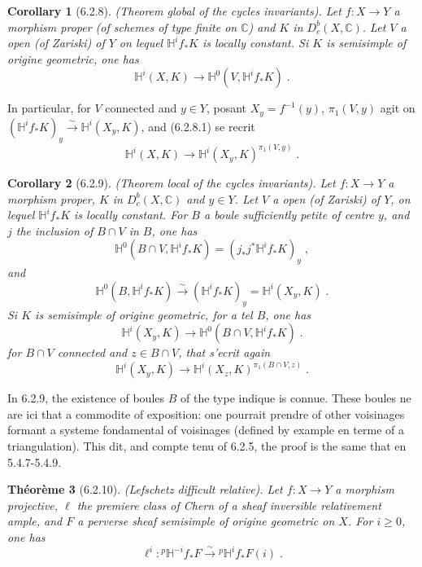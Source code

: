 \documentclass[12pt,a4paper]{article}
\theoremstyle{plain}
\newtheorem{theorem}{Th\'eor\`eme}[section]
\newtheorem{corollary}[theorem]{Corollary}
\theoremstyle{definition}
\theoremstyle{remark}
\newcommand{\CC}{\mathbb{C}}
\newcommand{\HH}{\mathbb{H}}
\begin{document}
\begin{corollary}[6.2.8]\label{cor:6.2.8}(Theorem global of the cycles invariants).
Let $f: X \to Y$ a morphism proper (of schemes of type finite on $\CC$) and $K$ in $D^b_c(X, \CC)$. Let $V$ a open (of Zariski) of $Y$ on lequel $\HH^if_*K$ is locally constant. Si $K$ is semisimple of origine geometric, one has
\begin{equation}\label{eq:6.2.8.1}
\HH^i(X, K) \longrightarrow \HH^0(V, \HH^if_*K)\;.
\end{equation}
\end{corollary}

In particular, for $V$ connected and $y \in Y$, posant $X_y = f^{-1}(y)$, $\pi_1(V, y)$ agit on $(\HH^if_*K)_y \xrightarrow{\sim} \HH^i(X_y, K)$, and (6.2.8.1) se recrit
\begin{equation}\label{eq:6.2.8.2}
\HH^i(X, K) \longrightarrow \HH^i(X_y, K)^{\pi_1(V, y)}\;.
\end{equation}

\begin{corollary}[6.2.9]\label{cor:6.2.9}(Theorem local of the cycles invariants).
Let $f: X \to Y$ a morphism proper, $K$ in $D^b_c(X, \CC)$ and $y \in Y$. Let $V$ a open (of Zariski) of $Y$, on lequel $\HH^if_*K$ is locally constant. For $B$ a boule sufficiently petite of centre $y$, and $j$ the inclusion of $B \cap V$ in $B$, one has
\[
\HH^0(B \cap V, \HH^if_*K) = (j_*j^*\HH^if_*K)_y\;,
\]
and
\[
\HH^0(B, \HH^if_*K) \xrightarrow{\sim} (\HH^if_*K)_y = \HH^i(X_y, K)\;.
\]
Si $K$ is semisimple of origine geometric, for a tel $B$, one has
\begin{equation}\label{eq:6.2.9.1}
\HH^i(X_y, K) \longrightarrow \HH^0(B \cap V, \HH^if_*K)\;.
\end{equation}
for $B \cap V$ connected and $z \in B \cap V$, that s'ecrit again
\begin{equation}\label{eq:6.2.9.2}
\HH^i(X_y, K) \longrightarrow \HH^i(X_z, K)^{\pi_1(B \cap V, z)}\;.
\end{equation}
\end{corollary}

In 6.2.9, the existence of boules $B$ of the type indique is connue. These boules ne are ici that a commodite of exposition: one pourrait prendre of other voisinages formant a systeme fondamental of voisinages (defined by example en terme of a triangulation). This dit, and compte tenu of 6.2.5, the proof is the same that en 5.4.7-5.4.9.

\begin{theorem}[6.2.10]\label{thm:6.2.10}(Lefschetz difficult relative).
Let $f: X \to Y$ a morphism projective, $\ell$ the premiere class of Chern of a sheaf inversible relativement ample, and $F$ a perverse sheaf semisimple of origine geometric on $X$. For $i \geq 0$, one has
\[
\ell^i: {}^{p}\HH^{-i}f_*F \xrightarrow{\sim} {}^{p}\HH^if_*F(i)\;.
\]
\end{theorem}
\end{document}

